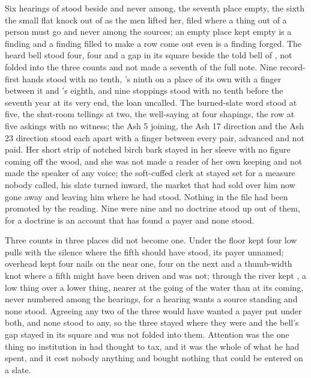 Six hearings of  stood beside and never among, the seventh place empty, the sixth the small flat knock out of  as the men lifted her, filed where a thing out of a person must go and never among the sources; an empty place kept empty is a finding and a finding filled to make a row come out even is a finding forged. The heard bell stood four, four and a gap in its square beside the told bell of , not folded into the three counts and not made a seventh of the full note. Nine record-first hands stood with no tenth, 's ninth on a place of its own with a finger between it and 's eighth, and nine stoppings stood with no tenth before the seventh year at its very end, the loan uncalled. The burned-slate word stood at five, the shut-room tellings at two, the well-saying at four shapings, the row at five askings with no witness; the Ash 5 joining, the Ash 17 direction and the Ash 23 direction stood each apart with a finger between every pair, advanced and not paid. Her short strip of notched birch bark stayed in her sleeve with no figure coming off the wood, and she was not made a reader of her own keeping and not made the speaker of any voice; the soft-cuffed clerk at  stayed set for a measure nobody called, his slate turned inward, the market that had sold over him now gone away and leaving him where he had stood. Nothing in the file had been promoted by the reading. Nine were nine and no doctrine stood up out of them, for a doctrine is an account that has found a payer and none stood.

Three counts in three places did not become one. Under the floor  kept four low pulls with the silence where the fifth should have stood, its payer unnamed; overhead  kept four nails on the near one, four on the next and a thumb-width knot where a fifth might have been driven and was not; through  the river kept , a low thing over a lower thing, nearer at the going of the water than at its coming, never numbered among the hearings, for a hearing wants a source standing and none stood. Agreeing any two of the three would have wanted a payer put under both, and none stood to any, so the three stayed where they were and the bell's gap stayed in its square and was not folded into them. Attention was the one thing no institution in  had thought to tax, and it was the whole of what he had spent, and it cost nobody anything and bought nothing that could be entered on a slate.

